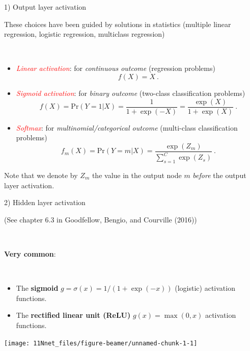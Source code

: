 \documentclass[
  10pt,
  ignorenonframetext,
]{beamer}
\providecommand{\tightlist}{%
  \setlength{\itemsep}{0pt}\setlength{\parskip}{0pt}}
\begin{document}
\begin{frame}
\begin{block}{1) Output layer activation}
\protect\hypertarget{output-layer-activation}{}
\(~\)

These choices have been guided by solutions in statistics (multiple
linear regression, logistic regression, multiclass regression)

\(~\)

\begin{itemize}
\item
  \emph{\textcolor{red}{Linear activation}}: for \emph{continuous
  outcome} (regression problems) \[f(X)=X \ .\]
\item
  \emph{\textcolor{red}{Sigmoid activation}}: for \emph{binary outcome}
  (two-class classification problems)
  \[f(X)=\text{Pr}(Y=1 | X ) = \frac{1}{1+\exp(-X)} = \frac{\exp(X)}{1+\exp(X)} \ .\]
\item
  \emph{\textcolor{red}{Softmax}}: for \emph{multinomial/categorical
  outcome} (multi-class classification problems) \[
  f_m(X) =  \text{Pr}(Y=m | X ) = \frac{\exp(Z_m)}{\sum_{s=1}^{C}\exp(Z_s)} \ .
  \]
\end{itemize}

\scriptsize

Note that we denote by \(Z_m\) the value in the output node \(m\)
\emph{before} the output layer activation.
\end{block}
\end{frame}

\begin{frame}
\begin{block}{2) Hidden layer activation}
\protect\hypertarget{hidden-layer-activation}{}
\tiny

(See chapter 6.3 in Goodfellow, Bengio, and Courville (2016))

\normalsize

\(~\)

\textbf{Very common}:

\(~\)

\begin{itemize}
\tightlist
\item
  The \textbf{sigmoid} \(g=\sigma(x)=1/(1+\exp(-x))\) (logistic)
  activation functions.
\item
  The \textbf{rectified linear unit (ReLU)} \(g(x)=\max(0,x)\)
  activation functions.
\end{itemize}

\vspace{2mm}

\centering

\texttt{[image: 11Nnet\_files/figure-beamer/unnamed-chunk-1-1]}
\end{block}
\end{frame}
\end{document}
